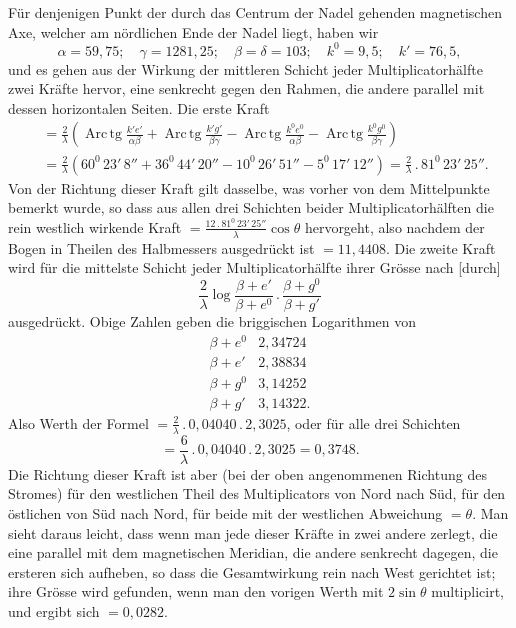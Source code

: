 Für denjenigen Punkt der durch das Centrum der Nadel gehenden magnetischen Axe, welcher am nördlichen Ende der Nadel liegt, haben wir
\[
\alpha=59{,}75;\quad\gamma=1281{,}25;\quad\beta=\delta=103;\quad k^0=9{,}5;\quad k'=76{,}5,
\]
\noindent und es gehen aus der Wirkung der mittleren Schicht jeder Multiplicatorhälfte zwei Kräfte hervor, eine senkrecht gegen den Rahmen, die andere parallel mit dessen horizontalen Seiten. Die erste Kraft
\[
\begin{aligned}
&=\frac{2}{\lambda}\left(\operatorname{Arc\,tg}\frac{k'e'}{\alpha\beta}+\operatorname{Arc\,tg}\frac{k'g'}{\beta\gamma}-\operatorname{Arc\,tg}\frac{k^0e^0}{\alpha\beta}-\operatorname{Arc\,tg}\frac{k^0g^0}{\beta\gamma}\right)\\[5pt]
&=\frac{2}{\lambda}(60^0\,23'\,8''+36^0\,44'\,20''-10^0\,26'\,51''-5^0\,17'\,12'')=\frac{2}{\lambda}\mathbin{.}81^0\,23'\,25''.
\end{aligned}
\]
\noindent Von der Richtung dieser Kraft gilt dasselbe, was vorher von dem Mittelpunkte bemerkt wurde, so dass aus allen drei Schichten beider Multiplicatorhälften die rein westlich wirkende Kraft $=\frac{12\mathbin{.}81^0\,23'\,25''}{\lambda}\cos\theta$ hervorgeht, also nachdem der Bogen in Theilen des Halbmessers ausgedrückt ist $=11{,}4408$. Die zweite Kraft wird für die mittelste Schicht jeder Multiplicatorhälfte ihrer Grösse nach [durch]
\[
\frac{2}{\lambda}\log\frac{\beta+e'}{\beta+e^0}\mathbin{.}\frac{\beta+g^0}{\beta+g'}
\]
\HistoricalFoot{}{24\textsuperscript{*}}
\clearpage{}
\noindent ausgedrückt. Obige Zahlen geben die briggischen Logarithmen von
\[
\begin{array}{lr}
\beta+e^0&2{,}34724\\
\beta+e'&2{,}38834\\
\beta+g^0&3{,}14252\\
\beta+g'&3{,}14322.
\end{array}
\]
\noindent Also Werth der Formel $=\frac{2}{\lambda}\mathbin{.}0{,}04040\mathbin{.}2{,}3025$, oder für alle drei Schichten
\[
=\frac{6}{\lambda}\mathbin{.}0{,}04040\mathbin{.}2{,}3025=0{,}3748.
\]
\noindent Die Richtung dieser Kraft ist aber (bei der oben angenommenen Richtung des Stromes) für den westlichen Theil des Multiplicators von Nord nach Süd, für den östlichen von Süd nach Nord, für beide mit der westlichen Abweichung $=\theta$. Man sieht daraus leicht, dass wenn man jede dieser Kräfte in zwei andere zerlegt, die eine parallel mit dem magnetischen Meridian, die andere senkrecht dagegen, die ersteren sich aufheben, so dass die Gesamtwirkung rein nach West gerichtet ist; ihre Grösse wird gefunden, wenn man den vorigen Werth mit $2\sin\theta$ multiplicirt, und ergibt sich $=0{,}0282$.

